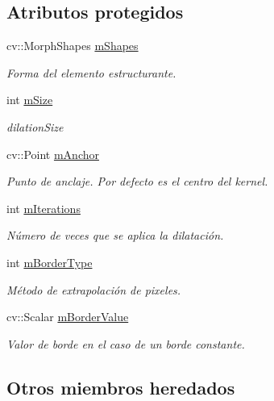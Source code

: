 \subsection*{Atributos protegidos}
\begin{DoxyCompactItemize}
\item 
cv\+::\+Morph\+Shapes \hyperlink{class_i3_d_1_1morphological_operation_a15b21c649cbb7f4f86625005c2390be3}{m\+Shapes}
\begin{DoxyCompactList}\small\item\em Forma del elemento estructurante. \end{DoxyCompactList}\item 
int \hyperlink{class_i3_d_1_1morphological_operation_a704f5eda2852dfdb30ef54f92d936e5a}{m\+Size}
\begin{DoxyCompactList}\small\item\em dilation\+Size \end{DoxyCompactList}\item 
cv\+::\+Point \hyperlink{class_i3_d_1_1morphological_operation_aea6a98ce1ee4c1a0f9767c227bd01988}{m\+Anchor}
\begin{DoxyCompactList}\small\item\em Punto de anclaje. Por defecto es el centro del kernel. \end{DoxyCompactList}\item 
int \hyperlink{class_i3_d_1_1morphological_operation_a559f56b17ef0ebbbba5e5a88c3bb113a}{m\+Iterations}
\begin{DoxyCompactList}\small\item\em Número de veces que se aplica la dilatación. \end{DoxyCompactList}\item 
int \hyperlink{class_i3_d_1_1morphological_operation_ae160ad01e68f62492633324306b87cb5}{m\+Border\+Type}
\begin{DoxyCompactList}\small\item\em Método de extrapolación de pixeles. \end{DoxyCompactList}\item 
cv\+::\+Scalar \hyperlink{class_i3_d_1_1morphological_operation_a9af41bcd3b3e9c5d44bbfdc31a707a9c}{m\+Border\+Value}
\begin{DoxyCompactList}\small\item\em Valor de borde en el caso de un borde constante. \end{DoxyCompactList}\end{DoxyCompactItemize}
\subsection*{Otros miembros heredados}


